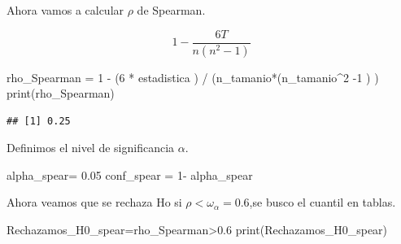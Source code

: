 \documentclass[
]{article}
\newenvironment{Shaded}{\begin{snugshade}}{\end{snugshade}}
\newcommand{\DecValTok}[1]{\textcolor[rgb]{0.00,0.00,0.81}{#1}}
\newcommand{\FloatTok}[1]{\textcolor[rgb]{0.00,0.00,0.81}{#1}}
\newcommand{\FunctionTok}[1]{\textcolor[rgb]{0.00,0.00,0.00}{#1}}
\newcommand{\NormalTok}[1]{#1}
\newcommand{\OtherTok}[1]{\textcolor[rgb]{0.56,0.35,0.01}{#1}}
\newcommand{\SpecialCharTok}[1]{\textcolor[rgb]{0.00,0.00,0.00}{#1}}
\begin{document}
\begin{Shaded}
\end{Shaded}

Ahora vamos a calcular \(\rho\) de Spearman.

\[ 1- \frac{6T}{n(n^{2}-1 )}\]

\begin{Shaded}
\begin{Highlighting}[]
\NormalTok{rho\_Spearman }\OtherTok{=} \DecValTok{1} \SpecialCharTok{{-}}\NormalTok{ (}\DecValTok{6} \SpecialCharTok{*}\NormalTok{ estadistica ) }\SpecialCharTok{/}\NormalTok{ (n\_tamanio}\SpecialCharTok{*}\NormalTok{(n\_tamanio}\SpecialCharTok{\^{}}\DecValTok{2} \SpecialCharTok{{-}}\DecValTok{1}\NormalTok{ ) )}
\FunctionTok{print}\NormalTok{(rho\_Spearman)}
\end{Highlighting}
\end{Shaded}

\begin{verbatim}
## [1] 0.25
\end{verbatim}

Definimos el nivel de significancia \(\alpha\).

\begin{Shaded}
\begin{Highlighting}[]
\NormalTok{alpha\_spear}\OtherTok{=} \FloatTok{0.05}
\NormalTok{conf\_spear }\OtherTok{=} \DecValTok{1}\SpecialCharTok{{-}}\NormalTok{ alpha\_spear }
\end{Highlighting}
\end{Shaded}

Ahora veamos que se rechaza Ho si \(\rho < \omega_{\alpha}= 0.6\),se
busco el cuantil en tablas.

\begin{Shaded}
\begin{Highlighting}[]
\NormalTok{Rechazamos\_H0\_spear}\OtherTok{=}\NormalTok{rho\_Spearman}\SpecialCharTok{\textgreater{}}\FloatTok{0.6}
\FunctionTok{print}\NormalTok{(Rechazamos\_H0\_spear)}
\end{Highlighting}
\end{Shaded}
\end{document}
